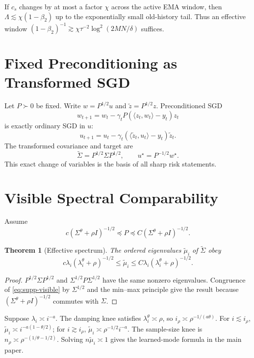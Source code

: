 \documentclass[letterpaper]{article}
\newtheorem{theorem}{Theorem}
\newcommand{\pre}{\preceq}
\begin{document}
If $c_s$ changes by at most a factor $\chi$ across the active EMA window, then $\Lambda\lesssim\chi(1-\beta_2)$ up to the exponentially small old-history tail.  Thus an effective window $(1-\beta_2)^{-1}\gtrsim\chi\tau^{-2}\log^2(2MN/\delta)$ suffices.

\section{Fixed Preconditioning as Transformed SGD}

Let $P\succ0$ be fixed.  Write $w=P^{1/2}u$ and $\widetilde z=P^{1/2}z$.  Preconditioned SGD
\[
 w_{t+1}=w_t-\gamma_tP(\langle z_t,w_t\rangle-y_t)z_t
\]
is exactly ordinary SGD in $u$:
\[
 u_{t+1}=u_t-\gamma_t(\langle\widetilde z_t,u_t\rangle-y_t)\widetilde z_t.
\]
The transformed covariance and target are
\[
 \widetilde\Sigma=P^{1/2}\Sigma P^{1/2},
 \qquad
 u^\star=P^{-1/2}w^\star.
\]
This exact change of variables is the basis of all sharp risk statements.

\section{Visible Spectral Comparability}

Assume
\begin{equation}
\label{eq:supp-visible}
 c(\Sigma^\theta+\rho I)^{-1/2}
 \pre P\pre
 C(\Sigma^\theta+\rho I)^{-1/2}.
\end{equation}

\begin{theorem}[Effective spectrum]
The ordered eigenvalues $\widetilde\mu_i$ of $\widetilde\Sigma$ obey
\[
 c\lambda_i(\lambda_i^\theta+\rho)^{-1/2}
 \le\widetilde\mu_i\le
 C\lambda_i(\lambda_i^\theta+\rho)^{-1/2}.
\]
\end{theorem}

\begin{proof}
$P^{1/2}\Sigma P^{1/2}$ and $\Sigma^{1/2}P\Sigma^{1/2}$ have the same nonzero eigenvalues.  Congruence of \eqref{eq:supp-visible} by $\Sigma^{1/2}$ and the min--max principle give the result because $(\Sigma^\theta+\rho I)^{-1/2}$ commutes with $\Sigma$.
\end{proof}

Suppose $\lambda_i\asymp i^{-a}$.  The damping knee satisfies $\lambda_i^\theta\asymp\rho$, so $i_\rho\asymp\rho^{-1/(a\theta)}$.  For $i\lesssim i_\rho$, $\widetilde\mu_i\asymp i^{-a(1-\theta/2)}$; for $i\gtrsim i_\rho$, $\widetilde\mu_i\asymp\rho^{-1/2}i^{-a}$.  The sample-size knee is $n_\rho\asymp\rho^{-(1/\theta-1/2)}$.  Solving $n\widetilde\mu_i\asymp1$ gives the learned-mode formula in the main paper.
\end{document}

